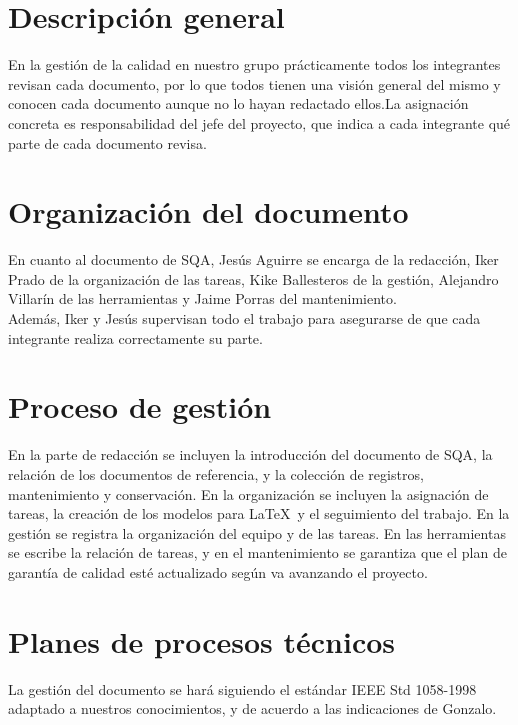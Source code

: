 \documentclass[spanish,a4paper,11pt, twoside]{report}	%
\begin{document}
	\section{ Descripción general}

	En la gestión de la calidad en nuestro grupo  prácticamente todos los integrantes revisan cada documento, por lo que todos tienen una visión general del mismo y conocen cada documento aunque no
	lo hayan redactado ellos.La asignación concreta es responsabilidad del jefe del proyecto, que indica a cada integrante qué parte de cada documento revisa.\\

	\section{Organización del documento}

	 En cuanto al documento de SQA, Jesús Aguirre se encarga de la redacción, Iker Prado de la organización de las tareas, Kike Ballesteros de la 
	gestión, Alejandro Villarín de las herramientas y Jaime Porras del mantenimiento.\\
	Además, Iker y Jesús supervisan todo el trabajo para asegurarse de que cada integrante realiza correctamente su parte.

	\section{ Proceso de gestión}
	
	En la parte de redacción se incluyen  la introducción del documento de SQA, la relación de los documentos de referencia, y la colección de registros, mantenimiento y conservación. En la organización se incluyen  la asignación de tareas, 
	la creación de los modelos para \LaTeX \ y el seguimiento del trabajo. En la gestión se registra la organización del equipo y de las tareas. En las herramientas se escribe la relación de tareas, y en el mantenimiento se garantiza
	que el plan de garantía de calidad esté actualizado según va avanzando el proyecto.\\

	\section{ Planes de procesos técnicos}
	
	La gestión del documento se hará siguiendo el estándar IEEE Std 1058-1998 adaptado a nuestros conocimientos, y de acuerdo a las indicaciones de Gonzalo.
	
\end{document}
